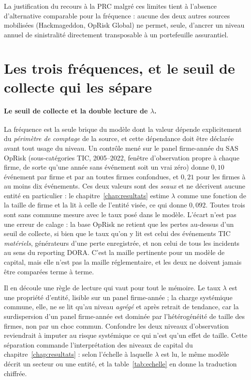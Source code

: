 La justification du recours à la PRC malgré ces limites tient à l'absence
d'alternative comparable pour la fréquence : aucune des deux autres sources
mobilisées (Hackmageddon, OpRisk Global) ne permet, seule, d'ancrer un niveau
annuel de sinistralité directement transposable à un portefeuille assurantiel.


\section{Les trois fréquences, et le seuil de collecte qui les sépare}


\paragraph{Le seuil de collecte et la double lecture de $\lambda$.}
La fréquence est la seule brique du modèle dont la valeur dépende
explicitement du \emph{périmètre de comptage} de la source, et cette dépendance
doit être déclarée avant tout usage du niveau. Un contrôle mené sur le panel
firme-année du SAS OpRisk (sous-catégories TIC, 2005--2022, fenêtre
d'observation propre à chaque firme, de sorte qu'une année sans événement soit
un vrai zéro) donne $0{,}10$ événement par firme et par an toutes firmes
confondues, et $0{,}21$ pour les firmes à au moins dix événements. Ces deux
valeurs sont des \emph{seaux} et ne décrivent aucune entité en particulier : le
chapitre~\ref{chap:resultats} estime $\lambda$ comme une fonction de la taille de
firme et la lit à celle de l'entité visée, ce qui donne $0{,}092$. Toutes trois
sont sans commune mesure avec le taux posé dans le modèle. L'écart n'est pas une erreur de
calage : la base OpRisk ne retient que les pertes au-dessus d'un seuil
de collecte, si bien que le taux qu'on y lit est celui des événements TIC
\emph{matériels}, générateurs d'une perte enregistrée, et non celui de tous les
incidents au sens du reporting DORA. C'est la maille pertinente pour un modèle
de capital, mais elle n'est pas la maille réglementaire, et les deux ne doivent
jamais être comparées terme à terme.

Il en découle une règle de lecture qui vaut pour tout le mémoire. Le taux
$\lambda$ est une propriété d'entité, lisible sur un panel
firme-année ; la charge systémique commune, elle, ne se lit qu'au niveau
\emph{agrégé} et après retrait de tendance, car la surdispersion d'un panel
firme-année est dominée par l'hétérogénéité de taille des firmes, non par un
choc commun. Confondre les deux niveaux d'observation reviendrait à imputer au
risque systémique ce qui n'est qu'un effet de taille. Cette séparation
commande l'interprétation des niveaux de capital du
chapitre~\ref{chap:resultats} : selon l'échelle à laquelle $\lambda$ est lu,
le même modèle décrit un secteur ou une entité, et la
table~\ref{tab:echelle} en donne la traduction chiffrée.

